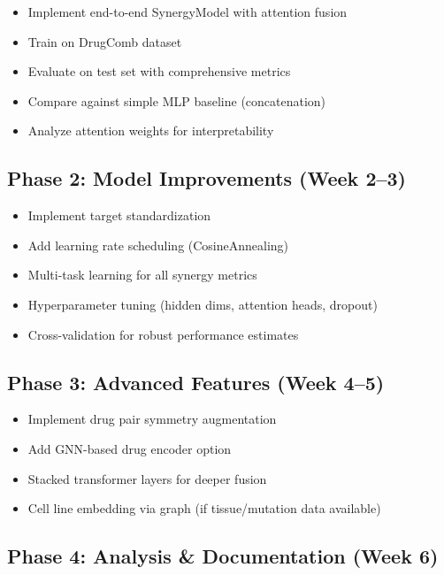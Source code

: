 \documentclass[10pt,twocolumn]{article}
\begin{document}
\begin{itemize}
    \item[\checkmark] Implement end-to-end SynergyModel with attention fusion
    \item[\checkmark] Train on DrugComb dataset
    \item[$\square$] Evaluate on test set with comprehensive metrics
    \item[$\square$] Compare against simple MLP baseline (concatenation)
    \item[$\square$] Analyze attention weights for interpretability
\end{itemize}

\subsection{Phase 2: Model Improvements (Week 2--3)}

\begin{itemize}
    \item[$\square$] Implement target standardization
    \item[$\square$] Add learning rate scheduling (CosineAnnealing)
    \item[$\square$] Multi-task learning for all synergy metrics
    \item[$\square$] Hyperparameter tuning (hidden dims, attention heads, dropout)
    \item[$\square$] Cross-validation for robust performance estimates
\end{itemize}

\subsection{Phase 3: Advanced Features (Week 4--5)}

\begin{itemize}
    \item[$\square$] Implement drug pair symmetry augmentation
    \item[$\square$] Add GNN-based drug encoder option
    \item[$\square$] Stacked transformer layers for deeper fusion
    \item[$\square$] Cell line embedding via graph (if tissue/mutation data available)
\end{itemize}

\subsection{Phase 4: Analysis \& Documentation (Week 6)}
\end{document}
